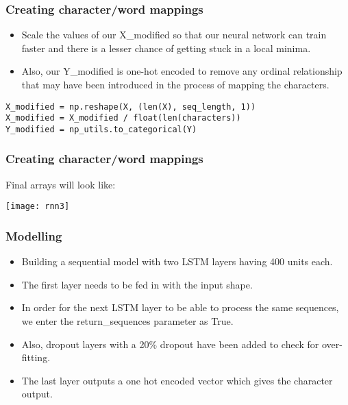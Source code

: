 \begin{frame}[fragile]
  \frametitle{Creating character/word mappings}

  \begin{itemize}
  \item Scale the values of our X\_modified so that our neural network can train faster and there is a lesser chance of getting stuck in a local minima. 
  \item Also, our Y\_modified is one-hot encoded to remove any ordinal relationship that may have been introduced in the process of mapping the characters. 
  	  \end{itemize}  	  
  	  
\begin{lstlisting}
X_modified = np.reshape(X, (len(X), seq_length, 1))
X_modified = X_modified / float(len(characters))
Y_modified = np_utils.to_categorical(Y)
\end{lstlisting}  	  

 \end{frame} 
 
\begin{frame}[fragile]
  \frametitle{Creating character/word mappings}
Final arrays will look like:
\begin{center}
\texttt{[image: rnn3]}
\end{center}
 \end{frame} 
 
\begin{frame}[fragile]
  \frametitle{Modelling}

  \begin{itemize}
  \item Building a sequential model with two LSTM layers having 400 units each. 
  \item The first layer needs to be fed in with the input shape. 
  \item In order for the next LSTM layer to be able to process the same sequences, we enter the return\_sequences parameter as True.
\item Also, dropout layers with a 20\% dropout have been added to check for over-fitting. 
\item The last layer outputs a one hot encoded vector which gives the character output.
  	  \end{itemize}  	  
  	  
\end{frame} 
 
